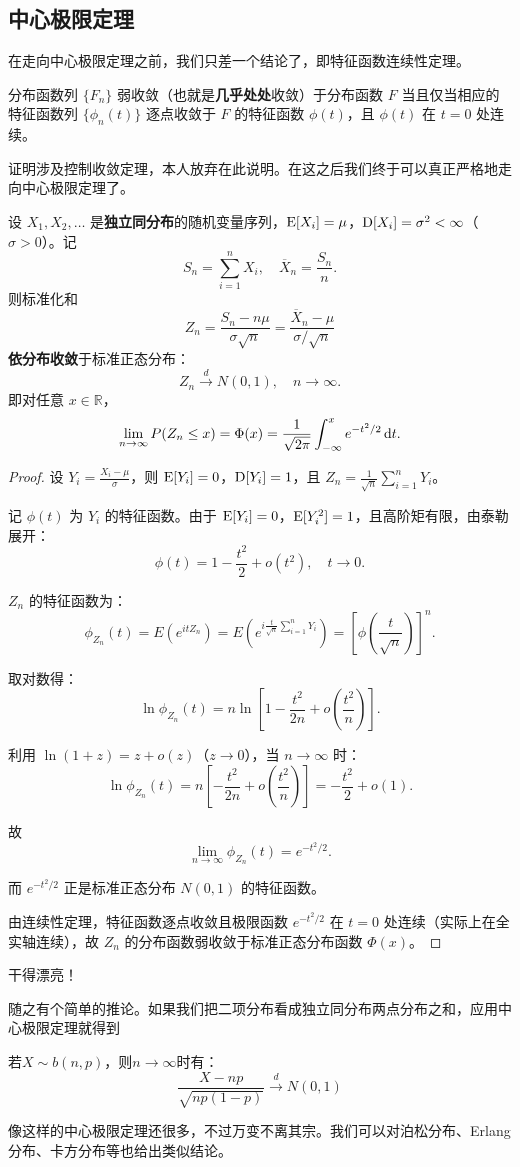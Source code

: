 \subsection{中心极限定理}

在走向中心极限定理之前，我们只差一个结论了，即特征函数连续性定理。

\begin{theorem}[连续性定理]
分布函数列 $\{F_n\}$ 弱收敛（也就是\textbf{几乎处处}收敛）于分布函数 $F$ 当且仅当相应的特征函数列 $\{\phi_n(t)\}$ 逐点收敛于 $F$ 的特征函数 $\phi(t)$，且 $\phi(t)$ 在 $t=0$ 处连续。
\end{theorem}

证明涉及控制收敛定理，本人放弃在此说明。在这之后我们终于可以真正严格地走向中心极限定理了。

\begin{theorem}
设 $X_1, X_2, \dots$ 是\textbf{独立同分布}的随机变量序列，$\operatorname{E}[X_i] = \mu$，$\operatorname{D}[X_i] = \sigma^2 < \infty$（$\sigma > 0$）。记
\[
S_n = \sum_{i=1}^n X_i, \quad \overline{X}_n = \frac{S_n}{n}.
\]
则标准化和
\[
Z_n = \frac{S_n - n\mu}{\sigma\sqrt{n}} = \frac{\overline{X}_n - \mu}{\sigma/\sqrt{n}}
\]
\textbf{依分布收敛}于标准正态分布：
\[
Z_n \xrightarrow{d} N(0,1), \quad n \to \infty.
\]
即对任意 $x \in \mathbb{R}$，
\[
\lim_{n\to\infty} P(Z_n \le x) = \Phi(x) = \frac{1}{\sqrt{2\pi}} \int_{-\infty}^x e^{-t^2/2} \mathop{}\!\mathrm{d} t.
\]
\end{theorem}

\begin{proof}
设 $Y_i = \frac{X_i - \mu}{\sigma}$，则 $\operatorname{E}[Y_i]=0$，$\operatorname{D}[Y_i]=1$，且 $Z_n = \frac{1}{\sqrt{n}} \sum_{i=1}^n Y_i$。

记 $\phi(t)$ 为 $Y_i$ 的特征函数。由于 $\operatorname{E}[Y_i]=0$，$\operatorname{E}[Y_i^2]=1$，且高阶矩有限，由泰勒展开：
\[
\phi(t) = 1 - \frac{t^2}{2} + o(t^2), \quad t \to 0.
\]

$Z_n$ 的特征函数为：
\[
\phi_{Z_n}(t) = E\left(e^{itZ_n}\right) = E\left(e^{i\frac{t}{\sqrt{n}}\sum_{i=1}^n Y_i}\right) = \left[\phi\left(\frac{t}{\sqrt{n}}\right)\right]^n.
\]

取对数得：
\[
\ln \phi_{Z_n}(t) = n \ln\left[1 - \frac{t^2}{2n} + o\left(\frac{t^2}{n}\right)\right].
\]

利用 $\ln(1+z) = z + o(z)$（$z\to 0$），当 $n\to\infty$ 时：
\[
\ln \phi_{Z_n}(t) = n\left[-\frac{t^2}{2n} + o\left(\frac{t^2}{n}\right)\right] = -\frac{t^2}{2} + o(1).
\]

故
\[
\lim_{n\to\infty} \phi_{Z_n}(t) = e^{-t^2/2}.
\]

而 $e^{-t^2/2}$ 正是标准正态分布 $N(0,1)$ 的特征函数。

由连续性定理，特征函数逐点收敛且极限函数 $e^{-t^2/2}$ 在 $t=0$ 处连续（实际上在全实轴连续），故 $Z_n$ 的分布函数弱收敛于标准正态分布函数 $\Phi(x)$。
\end{proof}

干得漂亮！

随之有个简单的推论。如果我们把二项分布看成独立同分布两点分布之和，应用中心极限定理就得到
\begin{theorem}
若$X\sim b(n,p)$，则$n\to\infty$时有：
\[
\frac{X-np}{\sqrt{np(1-p)}}\xrightarrow{d} N(0,1)
\]
\end{theorem}

像这样的中心极限定理还很多，不过万变不离其宗。我们可以对泊松分布、Erlang分布、卡方分布等也给出类似结论。
